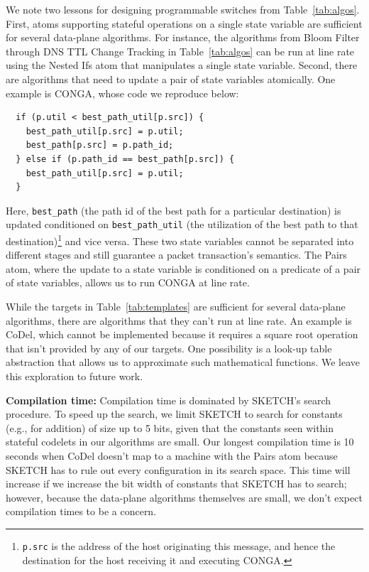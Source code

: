 We note two lessons for designing programmable
switches from Table~\ref{tab:algos}.
First, atoms supporting stateful operations on a single state
variable are sufficient for several data-plane algorithms. For instance, the
algorithms from Bloom Filter through DNS TTL Change Tracking in
Table~\ref{tab:algos} can be run at line rate using the Nested Ifs atom that
manipulates a single state variable. Second, there are algorithms that need
to update a pair of state variables atomically. One example is CONGA,
whose code we reproduce below:
\begin{verbatim}
  if (p.util < best_path_util[p.src]) {
    best_path_util[p.src] = p.util;
    best_path[p.src] = p.path_id;
  } else if (p.path_id == best_path[p.src]) {
    best_path_util[p.src] = p.util;
  }
\end{verbatim}
Here, \texttt{best\_path} (the path id of the best path for a particular
destination) is updated conditioned on \texttt{best\_path\_util} (the
utilization of the best path to that destination)\footnote{{\tt p.src} is the
  address of the host originating this message, and hence the destination for
the host receiving it and executing CONGA.} and vice versa. These two state
variables cannot be separated into different stages and still guarantee a
packet transaction's semantics. The Pairs atom, where the update to a state
variable is conditioned on a predicate of a pair of state variables, allows us
to run CONGA at line rate.

While the targets in Table~\ref{tab:templates} are sufficient for several
data-plane algorithms, there are algorithms that they can't run at line rate.
An example is CoDel, which cannot be implemented because it requires a square
root operation that isn't provided by any of our targets. One possibility is a
look-up table abstraction that allows us to approximate such
mathematical functions. We leave this exploration to future work.

\textbf{Compilation time:}
Compilation time is dominated by SKETCH's search procedure.  To speed up the
search, we limit SKETCH to search for constants (e.g., for addition) of size up
to 5 bits, given that the constants seen within stateful codelets in our
algorithms are small. Our longest compilation time is 10 seconds when CoDel
doesn't map to a \absmachine machine with the Pairs atom because SKETCH has to
rule out every configuration in its search space.  This time will increase if
we increase the bit width of constants that SKETCH has to search; however,
because the data-plane algorithms themselves are small, we don't expect
compilation times to be a concern.

